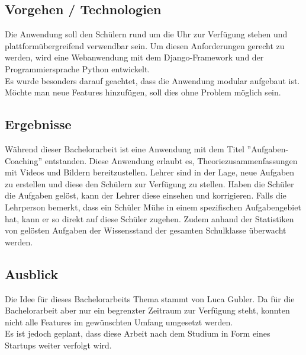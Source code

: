 

\subsection{Vorgehen / Technologien}
Die Anwendung soll den Schülern rund um die Uhr zur Verfügung stehen und plattformübergreifend verwendbar sein. Um diesen Anforderungen gerecht zu werden, wird eine Webanwendung mit dem Django-Framework und der Programmiersprache Python entwickelt. \\
Es wurde besonders darauf geachtet, dass die Anwendung modular aufgebaut ist. Möchte man neue Features hinzufügen, soll dies ohne Problem möglich sein.

\subsection{Ergebnisse}
Während dieser Bachelorarbeit ist eine Anwendung mit dem Titel ''Aufgaben-Coaching'' entstanden. Diese Anwendung erlaubt es, Theoriezusammenfassungen mit Videos und Bildern bereitzustellen. Lehrer sind in der Lage, neue Aufgaben zu erstellen und diese den Schülern zur Verfügung zu stellen. Haben die Schüler die Aufgaben gelöst, kann der Lehrer diese einsehen und korrigieren. Falls die Lehrperson bemerkt, dass ein Schüler Mühe in einem spezifischen Aufgabengebiet hat, kann er so direkt auf diese Schüler zugehen. Zudem anhand der Statistiken von gelösten Aufgaben der Wissensstand der gesamten Schulklasse überwacht werden.

\subsection{Ausblick}
Die Idee für dieses Bachelorarbeits Thema stammt von Luca Gubler. Da für die Bachelorarbeit aber nur ein begrenzter Zeitraum zur Verfügung steht, konnten nicht alle Features im gewünschten Umfang umgesetzt werden. \\

Es ist jedoch geplant, dass diese Arbeit nach dem Studium in Form eines Startups weiter verfolgt wird.


\newpage